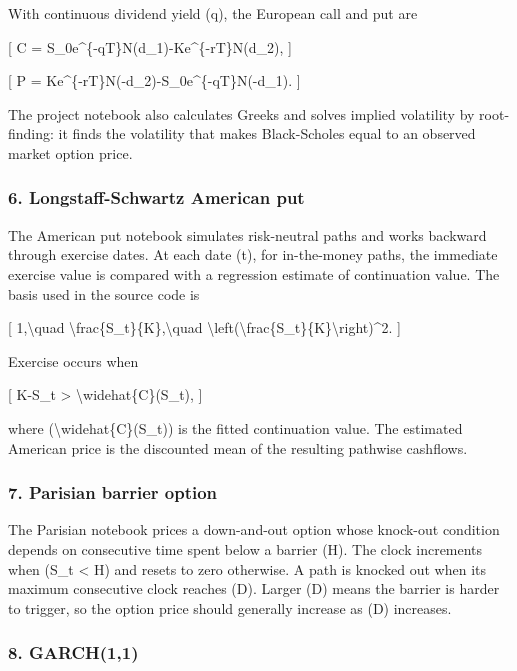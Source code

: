 \documentclass[
  11pt,
]{article}
\begin{document}
With continuous dividend yield (q), the European call and put are

{[} C = S\_0e\^{}\{-qT\}N(d\_1)-Ke\^{}\{-rT\}N(d\_2), {]}

{[} P = Ke\^{}\{-rT\}N(-d\_2)-S\_0e\^{}\{-qT\}N(-d\_1). {]}

The project notebook also calculates Greeks and solves implied volatility by root-finding: it finds the volatility that makes Black-Scholes equal to an observed market option price.

\subsubsection{6. Longstaff-Schwartz American put}\label{6-longstaff-schwartz-american-put}

The American put notebook simulates risk-neutral paths and works backward through exercise dates. At each date (t), for in-the-money paths, the immediate exercise value is compared with a regression estimate of continuation value. The basis used in the source code is

{[} 1,\textbackslash quad \textbackslash frac\{S\_t\}\{K\},\textbackslash quad \textbackslash left(\textbackslash frac\{S\_t\}\{K\}\textbackslash right)\^{}2. {]}

Exercise occurs when

{[} K-S\_t \textgreater{} \textbackslash widehat\{C\}(S\_t), {]}

where (\textbackslash widehat\{C\}(S\_t)) is the fitted continuation value. The estimated American price is the discounted mean of the resulting pathwise cashflows.

\subsubsection{7. Parisian barrier option}\label{7-parisian-barrier-option}

The Parisian notebook prices a down-and-out option whose knock-out condition depends on consecutive time spent below a barrier (H). The clock increments when (S\_t \textless{} H) and resets to zero otherwise. A path is knocked out when its maximum consecutive clock reaches (D). Larger (D) means the barrier is harder to trigger, so the option price should generally increase as (D) increases.

\subsubsection{8. GARCH(1,1)}\label{8-garch11}
\end{document}
